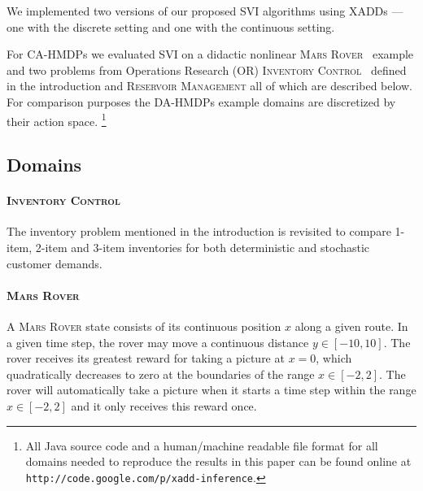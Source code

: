 \documentclass[twoside,11pt]{article}
\newcommand{\MarsRover}{\textsc{Mars Rover }}
\newcommand{\InventoryControl}{\textsc{Inventory Control }}
\newcommand{\WaterReservoir}{\textsc{Reservoir Management }}
\begin{document}
We implemented two versions of our proposed SVI algorithms using XADDs
--- one with the discrete setting and one with the continuous setting. 

For CA-HMDPs we evaluated SVI on a didactic nonlinear
\MarsRover\ example and two problems from Operations Research (OR) \InventoryControl\ defined in the introduction and \WaterReservoir  all of which are described below. For comparison purposes the DA-HMDPs example domains are discretized by their action space. \footnote{All Java source code and a human/machine readable file format for all domains needed to reproduce
the results in this paper can be found online at
\texttt{http://code.google.com/p/xadd-inference}.}

\subsection{Domains}

\paragraph{\InventoryControl}
The inventory problem mentioned in the introduction is revisited to compare 1-item, 2-item and 3-item inventories for both deterministic and stochastic customer demands. 
\paragraph{\MarsRover}
A \MarsRover state consists of its continuous position $x$ along a given route.  In a given time step, the rover may move a continuous distance $y \in [-10,10]$.  The rover receives its greatest reward for taking a picture at $x=0$, which quadratically decreases to zero at the boundaries of the range $x \in [-2,2]$.  The rover will
automatically take a picture when it starts a time step within the range $x \in [-2,2]$ and it only receives this reward once.
\end{document}
